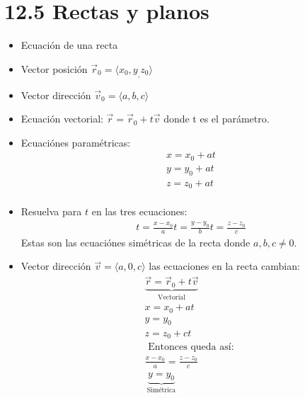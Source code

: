 \section{12.5 Rectas y planos}
\begin{itemize}
    \item Ecuación de una recta 
    \item Vector posición $\vec{r}_0  = \langle x_0,y_,z_0 \rangle $
    \item Vector dirección $\vec{v}_0 = \langle a,b,c \rangle$
    \item Ecuación vectorial: $\vec{r} = \vec{r}_0 + t\vec{v}$ donde t es el parámetro.
    \item Ecuaciónes paramétricas: \begin{align*}
        x = x_0 +at \\ 
        y = y_0+ at \\ 
        z = z_0+at \\ 
    \end{align*}
    
    \item Resuelva para $t$ en las tres ecuaciones:  
        \begin{align*}
            t = \frac{x-x_0}{a} 
            t = \frac{y-y_0}{b} 
            t = \frac{z-z_0}{c} 
        \end{align*}
        Estas son las ecuaciónes simétricas de la recta donde $a,b,c \neq 0$.
        
        \item Vector dirección $\vec{v}= \langle a,0,c \rangle $ las ecuaciones en la recta cambian:
            \begin{align*}
                \underbrace{\vec{r} = \vec{r}_0 + t \vec{v}}_{\text{  Vectorial  }} \\ 
                x = x_0+at \\ 
                y = y_0 \\ 
                z = z_0 +ct \\ 
                \text{  Entonces queda así:  } \\ 
                \frac{x-x_0}{a} = \frac{z-z_0}{c} \\ 
                \underbrace{y = y_0}_{\text{  Simétrica  }} \\   
            \end{align*}
\end{itemize}

